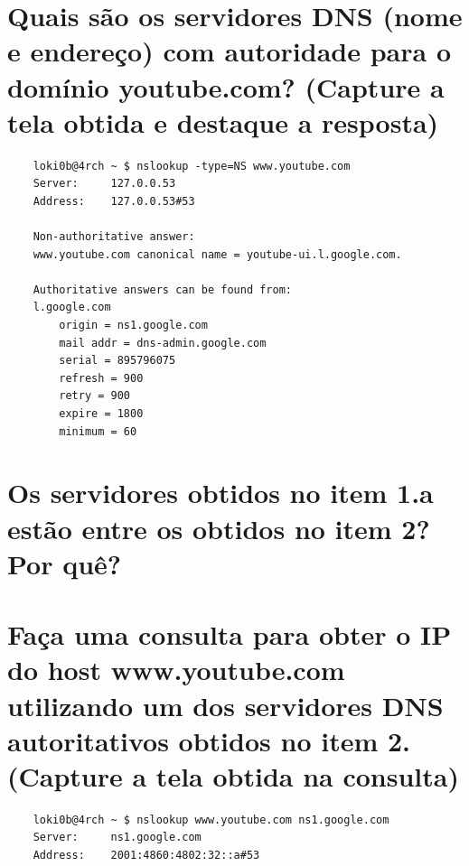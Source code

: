 \begin{parts}
    \part{Quais são os servidores DNS (nome e endereço) com autoridade para o domínio youtube.com? (Capture a tela obtida e destaque a resposta)}
    \begin{solution}
    \begin{verbatim}
    loki0b@4rch ~ $ nslookup -type=NS www.youtube.com
    Server:		127.0.0.53
    Address:	127.0.0.53#53

    Non-authoritative answer:
    www.youtube.com	canonical name = youtube-ui.l.google.com.

    Authoritative answers can be found from:
    l.google.com
        origin = ns1.google.com
        mail addr = dns-admin.google.com
        serial = 895796075
        refresh = 900
        retry = 900
        expire = 1800
        minimum = 60
    \end{verbatim}
    \end{solution}

    \part{Os servidores obtidos no item 1.a estão entre os obtidos no item 2? Por quê?}
    \begin{solution}
        
    \end{solution}

    \part{Faça uma consulta para obter o IP do host www.youtube.com utilizando um dos servidores DNS autoritativos obtidos no item 2.(Capture a tela obtida na consulta)}
    \begin{solution}
    \begin{verbatim}
    loki0b@4rch ~ $ nslookup www.youtube.com ns1.google.com
    Server:		ns1.google.com
    Address:	2001:4860:4802:32::a#53


\end{verbatim}
\end{solution}
\end{parts}
